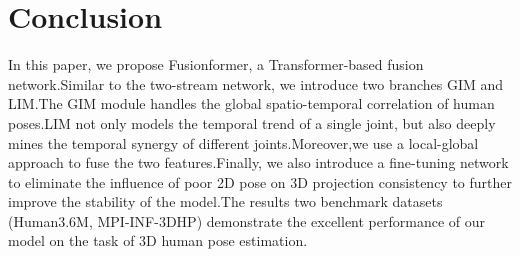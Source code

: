 \documentclass{article}
\begin{document}
\section{Conclusion}
In this paper, we propose Fusionformer, a Transformer-based fusion network.Similar to the two-stream network, we introduce two branches GIM and LIM.The GIM module handles the global spatio-temporal correlation of human poses.LIM not only models the temporal trend of a single joint, but also deeply mines the temporal synergy of different joints.Moreover,we use a local-global approach to fuse the two features.Finally, we also introduce a fine-tuning network to eliminate the influence of poor 2D pose on 3D projection consistency to further improve the stability of the model.The results two benchmark datasets (Human3.6M, MPI-INF-3DHP) demonstrate the excellent performance of our model on the task of 3D human pose estimation.\\



\end{document}
